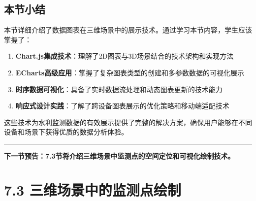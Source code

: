 {{{\subsection{本节小结}\label{ux672cux8282ux5c0fux7ed3-1} 本节详细介绍了数据图表在三维场景中的展示技术。通过学习本节内容，学生应该掌握了： \begin{enumerate}
\def\labelenumi{\arabic{enumi}.} \tightlist \item \textbf{Chart.js集成技术}：理解了2D图表与3D场景结合的技术架构和实现方法 \item
\textbf{ECharts高级应用}：掌握了复杂图表类型的创建和多参数数据的可视化展示 \item \textbf{时序数据可视化}：具备了实时数据流处理和动态图表更新的技术能力 \item
\textbf{响应式设计实践}：了解了跨设备图表展示的优化策略和移动端适配技术 \end{enumerate} 这些技术为水利监测数据的有效展示提供了完整的解决方案，确保用户能够在不同设备和场景下获得优质的数据分析体验。
\begin{center}\rule{0.5\linewidth}{0.5pt}\end{center} \textbf{下一节预告：7.3节将介绍三维场景中监测点的空间定位和可视化绘制技术。} \section{7.3
三维场景中的监测点绘制}\label{ux4e09ux7ef4ux573aux666fux4e2dux7684ux76d1ux6d4bux70b9ux7ed8ux5236} }}}
